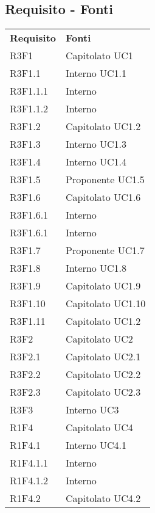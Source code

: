 	\subsection{Requisito - Fonti}
	\begin{longtable} {
			>{\centering}p{28mm}  
			>{}p{20mm}
		}
		\rowcolor{gray!50}
		\textbf{Requisito} & \textbf{Fonti}	\TBstrut \\
		R3F1 & Capitolato UC1 \TBstrut \\ [2mm]	
		R3F1.1 & Interno UC1.1 \TBstrut \\ [2mm]
		R3F1.1.1 & Interno \TBstrut \\ [2mm]
		R3F1.1.2 & Interno \TBstrut \\ [2mm]				
		R3F1.2 & Capitolato UC1.2 \TBstrut \\ [2mm]		
		R3F1.3 & Interno UC1.3 \TBstrut \\ [2mm]				
		R3F1.4 & Interno UC1.4 \TBstrut \\ [2mm]
		R3F1.5 & Proponente UC1.5 \TBstrut \\ [2mm]
		R3F1.6 & Capitolato UC1.6 \TBstrut \\ [2mm]
		R3F1.6.1 & Interno \TBstrut \\ [2mm]
		R3F1.6.1 & Interno \TBstrut \\ [2mm]
		R3F1.7 & Proponente UC1.7 \TBstrut \\ [2mm]
		R3F1.8 & Interno UC1.8 \TBstrut \\ [2mm]
		R3F1.9 & Capitolato UC1.9 \TBstrut \\ [2mm]
		R3F1.10 & Capitolato UC1.10 \TBstrut \\ [2mm]
		R3F1.11 & Capitolato UC1.2 \TBstrut \\ [2mm]
		R3F2 & Capitolato UC2 \TBstrut \\ [2mm]
		R3F2.1 & Capitolato UC2.1 \TBstrut \\ [2mm]
		R3F2.2 & Capitolato UC2.2 \TBstrut \\ [2mm]
		R3F2.3 & Capitolato UC2.3 \TBstrut \\ [2mm]
		R3F3 & Interno UC3 \TBstrut \\ [2mm]		
		R1F4 & Capitolato UC4 \TBstrut \\ [2mm]	
		R1F4.1 & Interno UC4.1 \TBstrut \\ [2mm]		
		R1F4.1.1 & Interno \TBstrut \\ [2mm]
		R1F4.1.2 & Interno \TBstrut \\ [2mm]		
		R1F4.2 & Capitolato UC4.2 \TBstrut \\ [2mm]				

\end{longtable}
